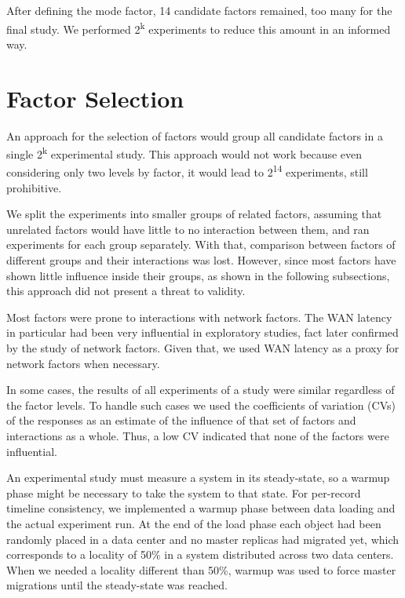 \documentclass[man,floatsintext,12pt]{apa6}
\begin{document}
After defining the mode factor, 14 candidate factors remained, too many for the
final study. We performed 2\textsuperscript{k} experiments to reduce this
amount in an informed way.

\section{Factor Selection}

An approach for the selection of factors would group all candidate factors in a
single 2\textsuperscript{k} experimental study. This approach would not work
because even considering only two levels by factor, it would lead to
2\textsuperscript{14} experiments, still prohibitive.

We split the experiments into smaller groups of related factors, assuming
that unrelated factors would have little to no interaction between them, and
ran experiments for each group separately. With that, comparison between
factors of different groups and their interactions was lost. However, since
most factors have shown little influence inside their groups, as shown in the
following subsections, this approach did not present a threat to validity.

Most factors were prone to interactions with network factors. The WAN latency
in particular had been very influential in exploratory studies, fact later
confirmed by the study of network factors. Given that, we used WAN latency as a
proxy for network factors when necessary.

In some cases, the results of all experiments of a study were similar
regardless of the factor levels. To handle such cases we used the coefficients
of variation (CVs) of the responses as an estimate of the influence of that set
of factors and interactions as a whole. Thus, a low CV indicated that none of
the factors were influential.

An experimental study must measure a system in its steady-state, so a warmup
phase might be necessary to take the system to that state. For per-record
timeline consistency, we implemented a warmup phase between data loading and
the actual experiment run. At the end of the load phase each object had been
randomly placed in a data center and no master replicas had migrated yet, which
corresponds to a locality of 50\% in a system distributed across two data
centers. When we needed a locality different than 50\%, warmup was used to
force master migrations until the steady-state was reached.
\end{document}
